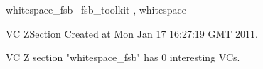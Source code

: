 \documentclass{article}
\begin{document}

\begin{zsection}
	 \SECTION whitespace\_fsb \parents~fsb\_toolkit , whitespace
\end{zsection}

VC ZSection Created at Mon Jan 17 16:27:19 GMT 2011.



 VC Z section "whitespace_fsb" has $0$ interesting VCs.



\end{document}
